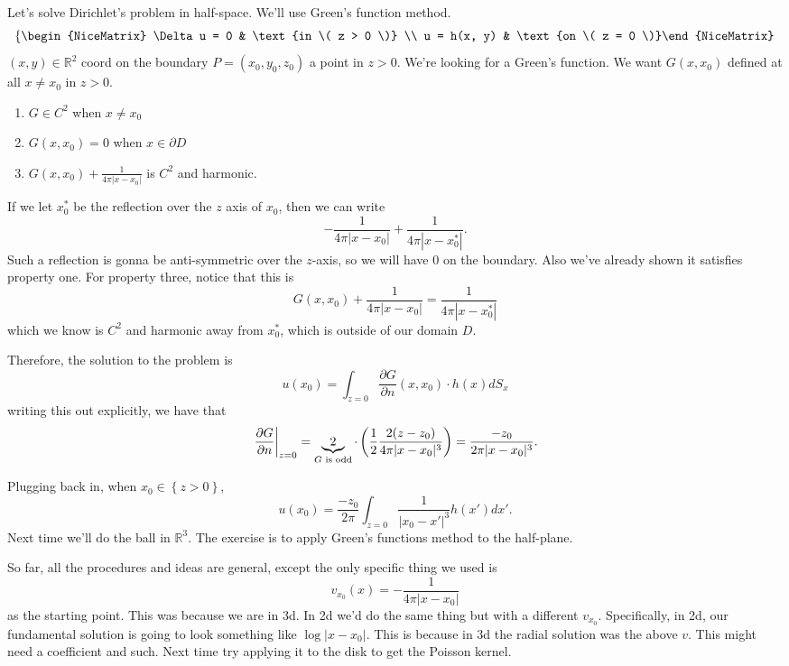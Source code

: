 Let's solve Dirichlet's problem in half-space. We'll use Green's function method. 
\[ \left\{\begin{NiceMatrix} \Delta u = 0 & \text{in \( z > 0 \)} \\ u = h(x, y) & \text{on \( z = 0 \)}\end{NiceMatrix}\right.  \]
\( (x, y) \in \mathbb{R}^{2} \) coord on the boundary \( P = (x_{0}, y_{0}, z_{0}) \) a point in \( z > 0 \). We're looking for a Green's function. We want \( G(x, x_{0}) \) defined at all \( x \ne x_{0} \) in \( z > 0 \).
\begin{enumerate}

	\item \( G \in C^{2} \) when \( x \ne x_{0} \)
	\item \( G(x, x_{0}) = 0 \) when \( x \in \partial D \)
	\item \( G(x, x_{0}) + \frac{1}{4 \pi |x-x_{0}|} \) is \( C^{2} \) and harmonic.

\end{enumerate}
If we let \( x_{0}^{*} \) be the reflection over the \( z \) axis of \( x_{0} \), then we can write
\[ - \frac{1}{4 \pi |x - x_{0}|} + \frac{1}{4 \pi |x - x_{0}^{*}|}. \]
Such a reflection is gonna be anti-symmetric over the \( z \)-axis, so we will have \( 0 \) on the boundary. Also we've already shown it satisfies property one. For property three, notice that this is
\[ G(x, x_{0}) + \frac{1}{4 \pi |x - x_{0}|} = \frac{1}{4 \pi |x - x_{0}^{*}|} \]
which we know is \( C^{2} \) and harmonic away from \( x_{0}^{*} \), which is outside of our domain \( D \).

Therefore, the solution to the problem is
\[ u(x_{0}) = \int_{z = 0} \frac{\partial G}{\partial n}(x, x_{0}) \cdot h(x) dS_{x} \]
writing this out explicitly, we have that
\[ \left.\frac{\partial G}{\partial n}\right|_{z = 0} = \underbrace{2}_{\text{\( G \) is odd}} \cdot \left( \frac{1}{2} \frac{2 (z - z_{0})}{4 \pi |x - x_{0}|^{3}} \right) = \frac{-z_{0}}{2 \pi |x-x_{0}|^{3}}. \]

	Plugging back in, when \( x_{0} \in \left\{ z > 0 \right\} \),
	\[ u(x_{0}) = \frac{- z_{0}}{2 \pi} \int_{z = 0}  \frac{1}{|x_{0} - x'|^{3}} h(x') dx'. \]
	Next time we'll do the ball in \( \mathbb{R}^{3} \). The exercise is to apply Green's functions method to the half-plane.

	\begin{remark}
		So far, all the procedures and ideas are general, except the only specific thing we used is
		\[ v_{x_{0}}(x) = - \frac{1}{4 \pi |x - x_{0}|} \]
		as the starting point. This was because we are in 3d. In 2d we'd do the same thing but with a different \( v_{x_{0}} \). Specifically, in 2d, our fundamental solution is going to look something like \( \log |x - x_{0}| \). This is because in 3d the radial solution was the above \( v \). This might need a coefficient and such. Next time try applying it to the disk to get the Poisson kernel.
	\end{remark}
